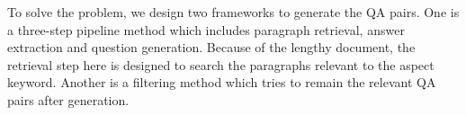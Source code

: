 

To solve the problem, we design two frameworks to generate the QA pairs. 
One is a three-step pipeline method which includes paragraph retrieval, answer extraction and question generation. 
Because of the lengthy document, the retrieval step here is designed to search the paragraphs relevant to the aspect keyword.
Another is a filtering method which tries to remain the relevant QA pairs after generation.


